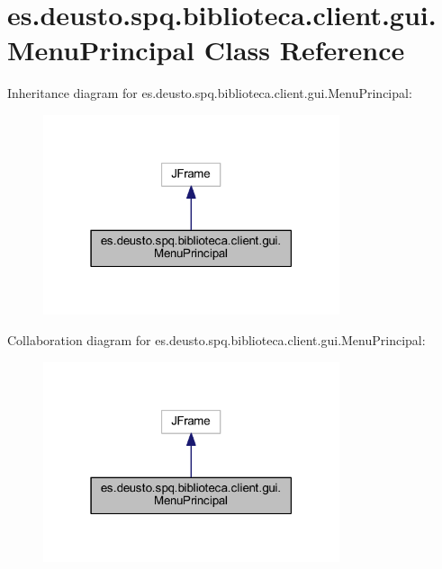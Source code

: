 \hypertarget{classes_1_1deusto_1_1spq_1_1biblioteca_1_1client_1_1gui_1_1_menu_principal}{}\section{es.\+deusto.\+spq.\+biblioteca.\+client.\+gui.\+Menu\+Principal Class Reference}
\label{classes_1_1deusto_1_1spq_1_1biblioteca_1_1client_1_1gui_1_1_menu_principal}


Inheritance diagram for es.\+deusto.\+spq.\+biblioteca.\+client.\+gui.\+Menu\+Principal\+:
\nopagebreak
\begin{figure}[H]
\begin{center}
\leavevmode
\includegraphics[width=247pt]{classes_1_1deusto_1_1spq_1_1biblioteca_1_1client_1_1gui_1_1_menu_principal__inherit__graph}
\end{center}
\end{figure}


Collaboration diagram for es.\+deusto.\+spq.\+biblioteca.\+client.\+gui.\+Menu\+Principal\+:
\nopagebreak
\begin{figure}[H]
\begin{center}
\leavevmode
\includegraphics[width=247pt]{classes_1_1deusto_1_1spq_1_1biblioteca_1_1client_1_1gui_1_1_menu_principal__coll__graph}
\end{center}
\end{figure}
